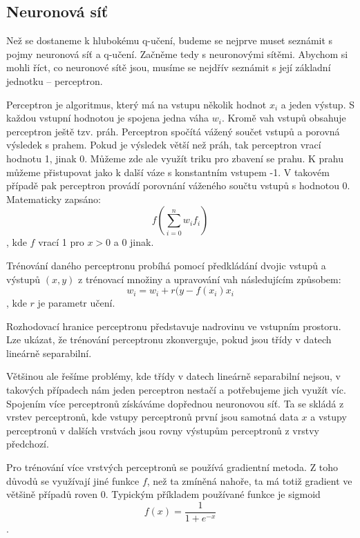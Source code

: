 \subsection{Neuronová síť}
Než se dostaneme k hlubokému q-učení, budeme se nejprve muset seznámit s pojmy neuronová síť a q-učení. Začněme tedy s neuronovými sítěmi.
Abychom si mohli říct, co neuronové sítě jsou, musíme se nejdřív seznámit s její základní jednotku – perceptron.
\par
Perceptron je algoritmus, který má na vstupu několik hodnot $x_i$ a jeden výstup. S každou vstupní hodnotou je spojena jedna váha $w_i$.
Kromě vah vstupů obsahuje perceptron ještě tzv. práh. Perceptron spočítá vážený součet vstupů a porovná výsledek s prahem. Pokud je výsledek větší než práh, tak perceptron vrací hodnotu 1, jinak 0.
Můžeme zde ale využít triku pro zbavení se prahu. K prahu můžeme přistupovat jako k další váze s konstantním vstupem -1.
V takovém případě pak perceptron provádí porovnání váženého součtu vstupů s hodnotou 0. 
\newline
Matematicky zapsáno:
\[f(\sum_{i=0}^{n} w_if_i)\], kde $f$ vrací 1 pro $x>0$ a 0 jinak.

Trénování daného perceptronu probíhá pomocí předkládání dvojic vstupů a výstupů $(x,y)$ z trénovací množiny a upravování vah následujícím způsobem:
\newline
\[w_i = w_i + r(y-f(x_i)x_i\], kde $r$ je parametr učení.

Rozhodovací hranice perceptronu představuje nadrovinu ve vstupním prostoru. Lze ukázat, že trénování perceptronu zkonverguje, pokud jsou třídy v datech lineárně separabilní.

Většinou ale řešíme problémy, kde třídy v datech lineárně separabilní nejsou, v takových případech nám jeden perceptron nestačí a potřebujeme jich využít víc.
Spojením více perceptronů získáváme dopřednou neuronovou síť. Ta se skládá z vrstev perceptronů, kde vstupy perceptronů první jsou samotná data $x$ a vstupy perceptronů v dalších vrstvách jsou rovny výstupům perceptronů z vrstvy předchozí.

Pro trénování více vrstvých perceptronů se používá gradientní metoda. Z toho důvodů se využívají jiné funkce $f$, než ta zmíněná nahoře, ta má totiž gradient ve většině případů roven 0.
Typickým příkladem používané funkce je sigmoid \[f(x) = \frac{1}{1+e^{-x}}\].

